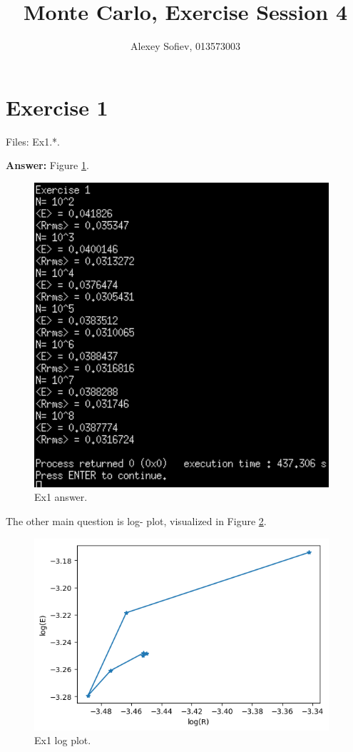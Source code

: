 \documentclass{article}
\begin{document}
\title{Monte Carlo, Exercise Session 4}
\author{Alexey Sofiev, 013573003}
\date{}

\maketitle


\section{Exercise 1}
Files: Ex1.*. 

\textbf{Answer:} Figure \ref{fig:ex1_answer}.

\begin{figure}[!hbt]
	\centering
	\includegraphics[width=4.3in]{ex1_answer}
	\caption{Ex1 answer.}
	\label{fig:ex1_answer}
\end{figure}

The other main question is log- plot, visualized in Figure \ref{fig:ex1_log}.

\begin{figure}[!hbt]
	\centering
	\includegraphics[width=4.3in]{ex1_log}
	\caption{Ex1 log plot.}
	\label{fig:ex1_log}
\end{figure}
\end{document}
